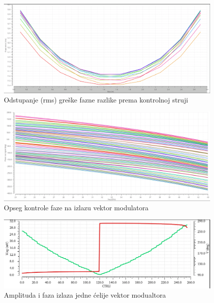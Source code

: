 \documentclass[journal,twocolumn,letterpaper]{IEEEJERM}
\begin{document}
\begin{figure}[!htbp]
  \centering
  \includegraphics[width=\linewidth]{phase_error_rms.png}
  \caption{Odstupanje (rms) greške fazne razlike prema kontrolnoj struji}
  \label{fig:phase_error_rms}
\end{figure}

\begin{figure}[!htbp]
  \centering
  \includegraphics[width=\linewidth]{phase_out_signal.png}
  \caption{Opseg kontrole faze na izlazu vektor modulatora}
  \label{fig:phase_out_signal}
\end{figure}

\begin{figure}[!htbp]
  \centering
  \includegraphics[width=\linewidth]{vga_linearity.png}
  \caption{Amplituda i faza izlaza jedne ćelije vektor modualtora}
  \label{fig:vga_linearity}
\end{figure}

\newpage
\end{document}
